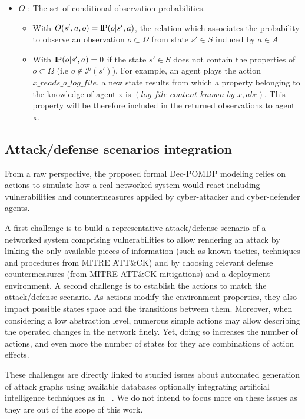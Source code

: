 \documentclass[conference]{IEEEtran}
\newcommand{\probP}{\text{I\kern-0.15em P}}
\begin{document}
\begin{itemize}
    \item $O$ : The set of conditional observation probabilities.
    \begin{itemize}
        \item With $O(s',a,o) = \probP(o|s',a)$, the relation which associates the probability to observe an observation $o \subset \Omega$ from state $s' \in S$ induced by $a \in A$
        \item With $\probP(o|s',a) = 0$ if the state $s' \in S$ does not contain the properties of $o \subset \Omega$ (i.e $o \not\in \mathcal{P}(s')$). For example, an agent plays the action $x\_reads\_a\_log\_file$, a new state results from which a property belonging to the knowledge of agent x is $(log\_file\_content\_known\_by\_x, \allowbreak abc)$. This property will be therefore included in the returned observations to agent x. 
    \end{itemize}

\end{itemize}


\subsection{Attack/defense scenarios integration\label{sec:ad_integration}}

\noindent
From a raw perspective, the proposed formal Dec-POMDP modeling relies on actions to simulate how a real networked system would react including vulnerabilities and countermeasures applied by cyber-attacker and cyber-defender agents.

A first challenge is to build a representative attack/defense scenario of a networked system comprising vulnerabilities to allow rendering an attack by linking the only available pieces of information (such as known tactics, techniques and procedures from MITRE ATT\&CK) and by choosing relevant defense countermeasures (from MITRE ATT\&CK mitigations) and a deployment environment. A second challenge is to establish the actions to match the attack/defense scenario. As actions modify the environment properties, they also impact possible states space and the transitions between them.
Moreover, when considering a low abstraction level, numerous simple actions may allow describing the operated changes in the network finely. Yet, doing so increases the number of actions, and even more the number of states for they are combinations of action effects.

These challenges are directly linked to studied issues about automated generation of attack graphs using available databases optionally integrating artificial intelligence techniques as in ~\citep{GFalco2018}. We do not intend to focus more on these issues as they are out of the scope of this work.
\end{document}
